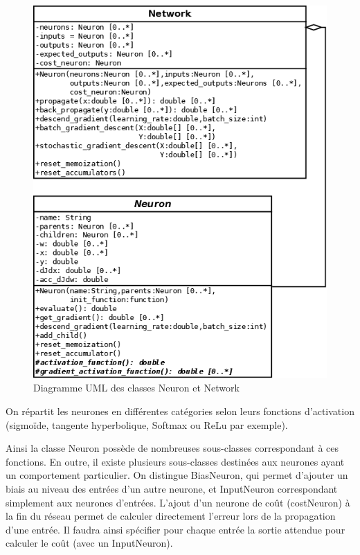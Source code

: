\begin{figure}
\begin{center}
\includegraphics[scale=0.3]{images/uml_simplifie_maispastrop_imp1.png}
\caption{Diagramme UML des classes Neuron et Network}
\label{Diagramme UML des classes Neuron et Network}
\end{center}
\end{figure}

On répartit les neurones en différentes catégories selon leurs fonctions d'activation (sigmoïde, tangente hyperbolique, Softmax ou ReLu par exemple).

Ainsi la classe Neuron possède de nombreuses sous-classes correspondant à ces fonctions. En outre, il existe plusieurs sous-classes destinées aux neurones ayant un comportement particulier. On distingue BiasNeuron, qui permet d'ajouter un biais au niveau des entrées d'un autre neurone, et InputNeuron correspondant simplement aux neurones d'entrées. L'ajout d'un neurone de coût (costNeuron) à la fin du réseau permet de calculer directement l'erreur lors de la propagation d'une entrée. Il faudra ainsi spécifier pour chaque entrée la sortie attendue pour calculer le coût (avec un InputNeuron).

